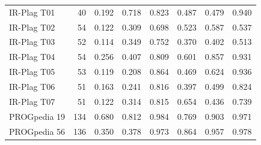 \begin{table}[t]
\begin{tabular}{lr|cccccc}
\midrule
IR-Plag T01 & 40 & 0.192 & 0.718 & 0.823 & 0.487 & 0.479 & 0.940 \\
IR-Plag T02 & 54 & 0.122 & 0.309 & 0.698 & 0.523 & 0.587 & 0.537 \\
IR-Plag T03 & 52 & 0.114 & 0.349 & 0.752 & 0.370 & 0.402 & 0.513 \\
IR-Plag T04 & 54 & 0.256 & 0.407 & 0.809 & 0.601 & 0.857 & 0.931 \\
IR-Plag T05 & 53 & 0.119 & 0.208 & 0.864 & 0.469 & 0.624 & 0.936 \\
IR-Plag T06 & 51 & 0.163 & 0.241 & 0.816 & 0.397 & 0.499 & 0.824 \\
IR-Plag T07 & 51 & 0.122 & 0.314 & 0.815 & 0.654 & 0.436 & 0.739 \\
PROGpedia 19 & 134 & 0.680 & 0.812 & 0.984 & 0.769 & 0.903 & 0.971 \\
PROGpedia 56 & 136 & 0.350 & 0.378 & 0.973 & 0.864 & 0.957 & 0.978 \\
\bottomrule
\end{tabular}
\end{table}
